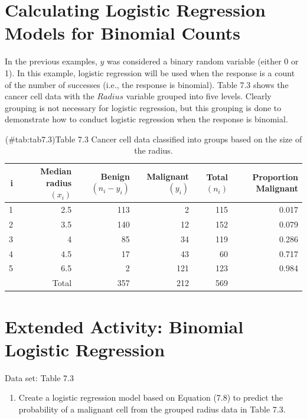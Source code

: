 \documentclass[
]{report}
\providecommand{\tightlist}{%
  \setlength{\itemsep}{0pt}\setlength{\parskip}{0pt}}
\begin{document}
\section{Calculating Logistic Regression Models for Binomial Counts}\label{calculating-logistic-regression-models-for-binomial-counts}

In the previous examples, \(y\) was considered a binary random variable (either 0 or 1). In this example, logistic regression will be used when the response is a count of the number of successes (i.e., the response is binomial). Table 7.3 shows the cancer cell data with the \(Radius\) variable grouped into five levels. Clearly grouping is not necessary for logistic regression, but this grouping is done to demonstrate how to conduct logistic regression when the response is binomial.

\begin{table}[!h]
\centering
\caption{(\#tab:tab7.3)Table 7.3 Cancer cell data classified into groups based on the size of the radius.}
\centering
\begin{tabular}[t]{rrrrrr}
\toprule
i & Median radius $(x_i)$ & Benign $(n_i - y_i)$ & Malignant $(y_i)$ & Total $(n_i)$ & Proportion Malignant\\
\midrule
1 & 2.5 & 113 & 2 & 115 & 0.017\\
2 & 3.5 & 140 & 12 & 152 & 0.079\\
3 & 4 & 85 & 34 & 119 & 0.286\\
4 & 4.5 & 17 & 43 & 60 & 0.717\\
5 & 6.5 & 2 & 121 & 123 & 0.984\\
\addlinespace
 & Total & 357 & 212 & 569 & \\
\bottomrule
\end{tabular}
\end{table}

\section*{Extended Activity: Binomial Logistic Regression}\label{extended-activity-binomial-logistic-regression}

Data set: Table 7.3

\begin{enumerate}
\def\labelenumi{\arabic{enumi}.}
\setcounter{enumi}{25}
\tightlist
\item
  Create a logistic regression model based on Equation (7.8) to predict the probability of a malignant cell from the grouped radius data in Table 7.3.\\
\end{enumerate}
\end{document}
